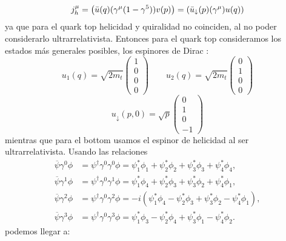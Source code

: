 \begin{equation}
	j_h^\mu = \pqty{ \bar{u}(q) (\gamma^\mu  (1-\gamma^5))v(p)} = \pqty{ \bar{u}_\downarrow (p) (\gamma^\mu )u (q)}
\end{equation}
ya que para el quark top helicidad y quiralidad no coinciden, al no poder considerarlo ultrarrelativista. Entonces para el quark top consideramos los estados más generales posibles, los espinores de Dirac \cite{SaboridoSilva2025ParticlePhysicsI,thomson_modern_physics}:
\begin{equation} 
	u_1(q)= \sqrt{2m_t} \begin{pmatrix}
		1 \\ 0 \\ 0 \\ 0
	\end{pmatrix} \qquad 
	u_2(q)= \sqrt{2m_t} \begin{pmatrix}
		0 \\ 1 \\ 0 \\ 0
	\end{pmatrix}
\end{equation}
\begin{equation} 
	u_\downarrow(p,0)= \sqrt{p} \begin{pmatrix}
		0 \\ 1 \\ 0 \\ -1
	\end{pmatrix}
\end{equation}
mientras que para el bottom usamos el espinor de helicidad al ser ultrarrelativista. Usando las relaciones \cite{SaboridoSilva2025ParticlePhysicsI,thomson_modern_physics}
\begin{align}
	\overline{\psi}\gamma^0\phi & = \psi^\dagger \gamma^0 \gamma^0 \phi
	= \psi_1^*\phi_1 + \psi_2^*\phi_2 + \psi_3^*\phi_3 + \psi_4^*\phi_4,     \\
	\overline{\psi}\gamma^1\phi & = \psi^\dagger \gamma^0 \gamma^1 \phi
	= \psi_1^*\phi_4 + \psi_2^*\phi_3 + \psi_3^*\phi_2 + \psi_4^*\phi_1,     \\
	\overline{\psi}\gamma^2\phi & = \psi^\dagger \gamma^0 \gamma^2 \phi
	= -i(\psi_1^*\phi_4 - \psi_2^*\phi_3 + \psi_3^*\phi_2 - \psi_4^*\phi_1), \\
	\overline{\psi}\gamma^3\phi & = \psi^\dagger \gamma^0 \gamma^3 \phi
	= \psi_1^*\phi_3 - \psi_2^*\phi_4 + \psi_3^*\phi_1 - \psi_4^*\phi_2.
\end{align}
podemos llegar a: 

